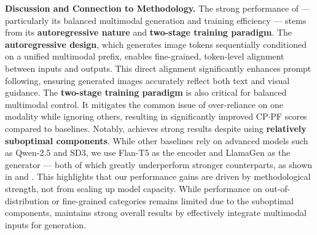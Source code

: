 \textbf{Discussion and Connection to Methodology.}
The strong performance of \model — particularly its balanced multimodal generation and training efficiency — stems from its \textbf{autoregressive nature} and \textbf{two-stage training paradigm}.
The \textbf{autoregressive design}, which generates image tokens sequentially conditioned on a unified multimodal prefix, enables fine-grained, token-level alignment between inputs and outputs. This direct alignment significantly enhances prompt following, ensuring generated images accurately reflect both text and visual guidance.
The \textbf{two-stage training paradigm} is also critical for balanced multimodal control. It mitigates the common issue of over-reliance on one modality while ignoring others, resulting in significantly improved CP$\cdotp$PF scores compared to baselines.
Notably, \model achieves strong results despite using \textbf{relatively suboptimal components}.
While other baselines rely on advanced models such as Qwen-2.5 and SD3, we use Flan-T5 as the encoder and LlamaGen as the generator — both of which greatly underperform stronger counterparts, as shown in  and . 
This highlights that our performance gains are driven by methodological strength, not from scaling up model capacity.
While performance on out-of-distribution or fine-grained categories remains limited due to the suboptimal components, \model maintains strong overall results by effectively integrate multimodal inputs for generation.






